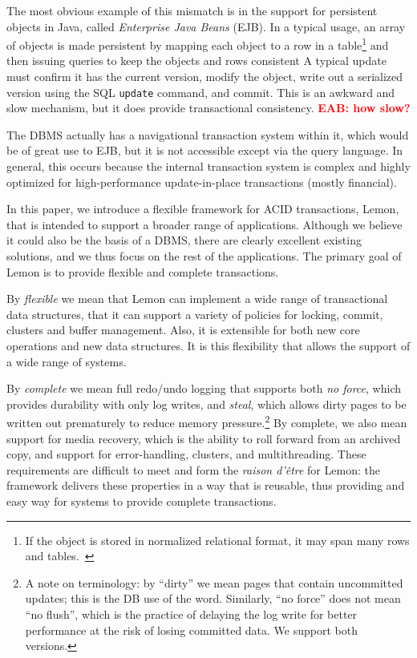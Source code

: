 \documentclass[letterpaper,twocolumn,english]{article}
\newcommand{\yad}{Lemon\xspace}
\newcommand{\eab}[1]{\textcolor{red}{\bf EAB: #1}}
\begin{document}
The most obvious example of this mismatch is in the support for
persistent objects in Java, called {\em Enterprise Java Beans}
(EJB). In a typical usage, an array of objects is made persistent by
mapping each object to a row in a table\footnote{If the object is
stored in normalized relational format, it may span many rows and tables.~\cite{Hibernate}} 
and then issuing queries to
keep the objects and rows consistent  A typical update must confirm
it has the current version, modify the object, write out a serialized
version using the SQL {\tt update} command, and commit.  This is an
awkward and slow mechanism, but it does provide transactional
consistency. \eab{how slow?}

The DBMS actually has a navigational transaction system within it,
which would be of great use to EJB, but it is not accessible except
via the query language.  In general, this occurs because the internal
transaction system is complex and highly optimized for
high-performance update-in-place transactions (mostly financial).

In this paper, we introduce a flexible framework for ACID
transactions, \yad, that is intended to support a broader range of
applications.  Although we believe it could also be the basis of a
DBMS, there are clearly excellent existing solutions, and we thus
focus on the rest of the applications.  The primary goal of \yad is to
provide flexible and complete transactions.

By {\em flexible} we mean that \yad can implement a wide range of
transactional data structures, that it can support a variety of
policies for locking, commit, clusters and buffer management. Also,
it is extensible for both new core operations and new data
structures.  It is this flexibility that allows the support of a wide
range of systems.

By {\em complete} we mean full redo/undo logging that supports both
{\em no force}, which provides durability with only log writes, and
{\em steal}, which allows dirty pages to be written out prematurely to
reduce memory pressure.\footnote{A note on terminology: by ``dirty''
we mean pages that contain uncommitted updates; this is the DB use of
the word. Similarly, ``no force'' does not mean ``no flush'', which is
the practice of delaying the log write for better performance at the
risk of losing committed data. We support both versions.} By complete,
we also mean support for media recovery, which is the ability to roll
forward from an archived copy, and support for error-handling,
clusters, and multithreading.  These requirements are difficult to
meet and form the {\em raison d'\^{e}tre} for \yad: the framework delivers
these properties in a way that is reusable, thus providing and easy
way for systems to provide complete transactions.
\end{document}
